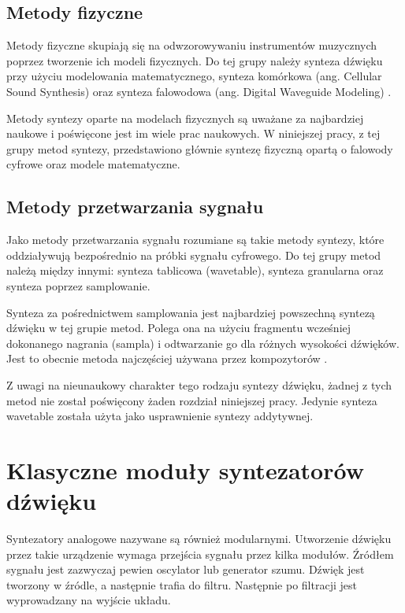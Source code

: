 \subsection{Metody fizyczne}
Metody fizyczne skupiają się na odwzorowywaniu instrumentów muzycznych poprzez tworzenie ich modeli fizycznych. Do tej grupy należy synteza dźwięku przy użyciu modelowania matematycznego, synteza komórkowa (ang. Cellular Sound Synthesis) oraz synteza falowodowa (ang. Digital Waveguide Modeling) \cite{czyzewski_dzwiek_cyfrowy}.

Metody syntezy oparte na modelach fizycznych są uważane za najbardziej naukowe i poświęcone jest im wiele prac naukowych. W niniejszej pracy, z tej grupy metod syntezy, przedstawiono głównie syntezę fizyczną opartą o falowody cyfrowe oraz modele matematyczne.

\subsection{Metody przetwarzania sygnału}
Jako metody przetwarzania sygnału rozumiane są takie metody syntezy, które oddziaływują bezpośrednio na próbki sygnału cyfrowego. Do tej grupy metod należą między innymi: synteza tablicowa (wavetable), synteza granularna oraz synteza poprzez samplowanie.

Synteza za pośrednictwem samplowania jest najbardziej powszechną syntezą dźwięku w tej grupie metod. Polega ona na użyciu fragmentu wcześniej dokonanego nagrania (sampla) i odtwarzanie go dla różnych wysokości dźwięków. Jest to obecnie metoda najczęściej używana przez kompozytorów \cite{misra_cook_przetw_syg}.

Z uwagi na nieunaukowy charakter tego rodzaju syntezy dźwięku, żadnej z tych metod nie został poświęcony żaden rozdział niniejszej pracy. Jedynie synteza wavetable została użyta jako usprawnienie syntezy addytywnej.


\section{Klasyczne moduły syntezatorów dźwięku}
Syntezatory analogowe nazywane są również modularnymi. Utworzenie dźwięku przez takie urządzenie wymaga przejścia sygnału przez kilka modułów. Źródłem sygnału jest zazwyczaj pewien oscylator lub generator szumu. Dźwięk jest tworzony w źródle, a następnie trafia do filtru. Następnie po filtracji jest wyprowadzany na wyjście układu.

